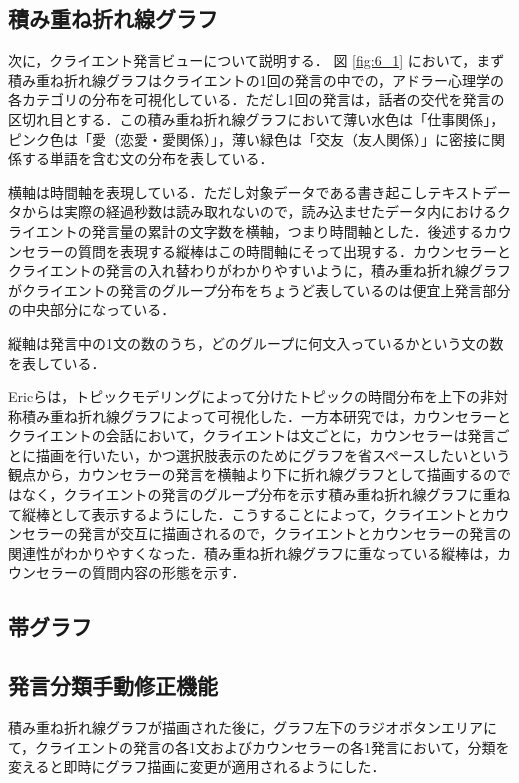\documentclass[shuuron]{kuee}
\begin{document}
\subsection{積み重ね折れ線グラフ}
次に，クライエント発言ビューについて説明する．
図
\ref{fig:6_1}
において，まず積み重ね折れ線グラフはクライエントの1回の発言の中での，アドラー心理学の各カテゴリの分布を可視化している．ただし1回の発言は，話者の交代を発言の区切れ目とする．この積み重ね折れ線グラフにおいて薄い水色は「仕事関係」，ピンク色は「愛（恋愛・愛関係）」，薄い緑色は「交友（友人関係）」に密接に関係する単語を含む文の分布を表している．

横軸は時間軸を表現している．ただし対象データである書き起こしテキストデータからは実際の経過秒数は読み取れないので，読み込ませたデータ内におけるクライエントの発言量の累計の文字数を横軸，つまり時間軸とした．後述するカウンセラーの質問を表現する縦棒はこの時間軸にそって出現する．カウンセラーとクライエントの発言の入れ替わりがわかりやすいように，積み重ね折れ線グラフがクライエントの発言のグループ分布をちょうど表しているのは便宜上発言部分の中央部分になっている．

縦軸は発言中の1文の数のうち，どのグループに何文入っているかという文の数を表している．



Ericら\cite{taskdriven}は，トピックモデリングによって分けたトピックの時間分布を上下の非対称積み重ね折れ線グラフによって可視化した．一方本研究では，カウンセラーとクライエントの会話において，クライエントは文ごとに，カウンセラーは発言ごとに描画を行いたい，かつ選択肢表示のためにグラフを省スペースしたいという観点から，カウンセラーの発言を横軸より下に折れ線グラフとして描画するのではなく，クライエントの発言のグループ分布を示す積み重ね折れ線グラフに重ねて縦棒として表示するようにした．こうすることによって，クライエントとカウンセラーの発言が交互に描画されるので，クライエントとカウンセラーの発言の関連性がわかりやすくなった．積み重ね折れ線グラフに重なっている縦棒は，カウンセラーの質問内容の形態を示す．


\subsection{帯グラフ}



\subsection{発言分類手動修正機能}
積み重ね折れ線グラフが描画された後に，グラフ左下のラジオボタンエリアにて，クライエントの発言の各1文およびカウンセラーの各1発言において，分類を変えると即時にグラフ描画に変更が適用されるようにした．
\end{document}
